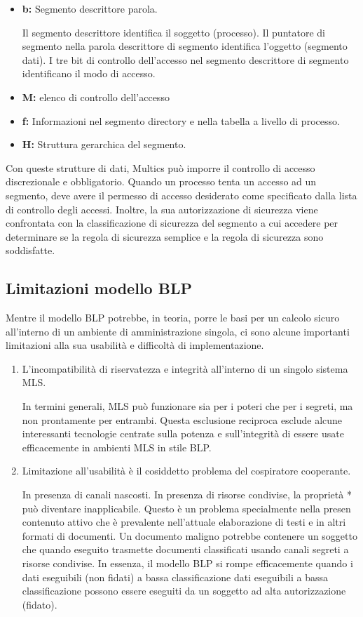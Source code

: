 \begin{itemize}
    \item \textbf{b:} Segmento descrittore parola.
    
    Il segmento descrittore identifica il soggetto (processo). Il puntatore di segmento nella parola descrittore di segmento identifica l'oggetto (segmento dati). I tre bit di controllo dell'accesso nel segmento descrittore di segmento identificano il modo di accesso.
    
    \item \textbf{M:} elenco di controllo dell'accesso
    
    \item \textbf{f:} Informazioni nel segmento directory e nella tabella a livello di processo.
    
    \item \textbf{H:} Struttura gerarchica del segmento.

\end{itemize}
Con queste strutture di dati, Multics può imporre il controllo di accesso discrezionale e obbligatorio. Quando un processo tenta un accesso ad un segmento, deve avere il permesso di accesso desiderato come specificato dalla lista di controllo degli accessi. Inoltre, la sua autorizzazione di sicurezza viene confrontata con la classificazione di sicurezza del segmento a cui accedere per determinare se la regola di sicurezza semplice e la regola di sicurezza sono soddisfatte.
\subsection{Limitazioni modello BLP}
Mentre il modello BLP potrebbe, in teoria, porre le basi per un calcolo sicuro all'interno di un ambiente di amministrazione singola, ci sono alcune importanti limitazioni alla sua usabilità e difficoltà di implementazione.

\begin{enumerate}
    \item L'incompatibilità di riservatezza e integrità all'interno di un singolo sistema MLS. 
    
    In termini generali, MLS può funzionare sia per i poteri che per i segreti, ma non prontamente per entrambi. Questa esclusione reciproca esclude alcune interessanti tecnologie centrate sulla potenza e sull'integrità di essere usate efficacemente in ambienti MLS in stile BLP.
    
    \item Limitazione all'usabilità è il cosiddetto problema del cospiratore cooperante.
    
    In presenza di canali nascosti. In presenza di risorse condivise, la proprietà * può diventare inapplicabile. Questo è un problema specialmente nella presen contenuto attivo che è prevalente nell'attuale elaborazione di testi e in altri formati di documenti. Un documento maligno potrebbe contenere un soggetto che quando eseguito trasmette documenti classificati usando canali segreti a risorse condivise. In essenza, il modello BLP si rompe efficacemente quando i dati eseguibili (non fidati) a bassa classificazione dati eseguibili a bassa classificazione possono essere eseguiti da un soggetto ad alta autorizzazione (fidato).
\end{enumerate}
\newpage
